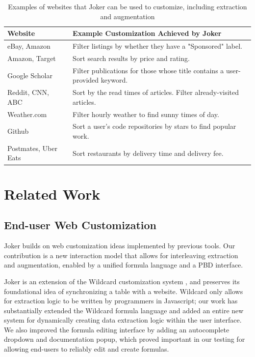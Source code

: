 \documentclass[sigconf,10pt]{acmart}
\begin{document}
\begin{table}[]
\centering
\begin{tabular}{|l|l|}
\hline
\textbf{Website}              & \textbf{Example Customization Achieved by Joker}                                        \\ \hline
eBay, Amazon            & Filter listings by whether they have a "Sponsored" label.                        \\
Amazon, Target & Sort search results by price and rating.                                                \\
Google Scholar                & Filter publications for those whose title contains a user-provided keyword. \\
Reddit, CNN, ABC  & Sort by the read times of articles. Filter already-visited articles.         \\
Weather.com                   & Filter hourly weather to find sunny times of day.                                        \\
Github                        & Sort a user's code repositories by stars to find popular work.                          \\
Postmates, Uber Eats    & Sort restaurants by delivery time and delivery fee.                                     \\ \hline
\end{tabular}
\vspace{8pt}
\caption{Examples of websites that Joker can be used to customize, including extraction and augmentation}
\end{table}

\hypertarget{sec:related-work}{%
\section{Related Work}\label{sec:related-work}}

\hypertarget{end-user-web-customization}{%
\subsection{End-user Web
Customization}\label{end-user-web-customization}}

Joker builds on web customization ideas implemented by previous tools.
Our contribution is a new interaction model that allows for interleaving
extraction and augmentation, enabled by a unified formula language and a
PBD interface.

Joker is an extension of the Wildcard customization system
\citep{litt2020}, and preserves its foundational idea of synchronizing a
table with a website. Wildcard only allows for extraction logic to be
written by programmers in Javascript; our work has substantially
extended the Wildcard formula language and added an entire new system
for dynamically creating data extraction logic within the user
interface. We also improved the formula editing interface by adding an
autocomplete dropdown and documentation popup, which proved important in
our testing for allowing end-users to reliably edit and create formulas.
\end{document}
